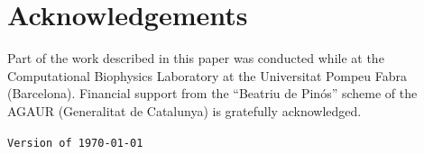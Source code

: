 \documentclass[preprint,review,11pt]{elsarticle}
\begin{document}




\section{Acknowledgements}

Part of the work described in this paper was conducted while at the
Computational Biophysics Laboratory at the Universitat Pompeu Fabra
(Barcelona). Financial support from the ``Beatriu de Pin\'os'' scheme
of the AGAUR (Generalitat de Catalunya) is gratefully acknowledged.







\vspace{2cm}

\texttt{Version of \longdate \today \, \currenttime}
\end{document}
